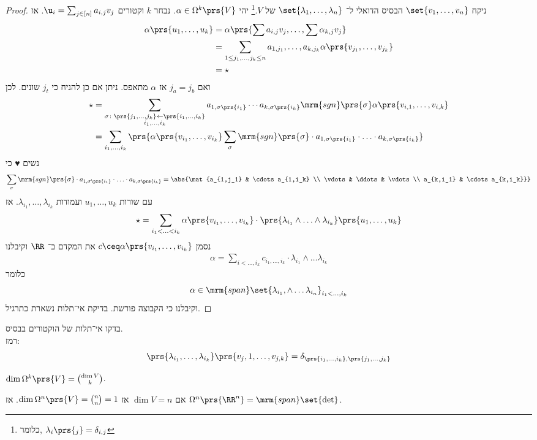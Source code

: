 \documentclass[a4paper,10pt,twoside,openany]{book}
\begin{document}
\begin{proof}
ניקח
$\set{v_1, \ldots, v_n}$
הבסיס הדואלי ל־%
$\set{\lambda_1, \ldots, \lambda_n}$
של
$V$.\footnote{
כלומר,
$\lambda_i\prs{_j} = \delta_{i,j}$
}
יהי
$\alpha \in \Omega^k\prs{V}$.
נבחר
$k$
וקטורים
$\u_{i} = \sum_{j \in [n]} a_{i,j}v_j$.
אז
\begin{align*}
\alpha\prs{u_1, \ldots, u_k} &= \alpha\prs{\sum a_{i,j} v_j, \ldots, \sum \alpha_{k,j} v_j} \\&=
\sum_{1 \leq j_1, \ldots, j_k \leq n} a_{1,j_1}, \ldots, a_{k,j_k} \alpha\prs{v_{j_1}, \ldots, v_{j_k}} \\&= \star
\end{align*}
ואם
$j_a = j_b$
אז
$\alpha$
מתאפס.
ניתן אם כן להניח כי
$j_t$
שונים.
לכן
\begin{align*}
\star &= \sum_{\substack{\sigma \colon \prs{j_1, \ldots, j_k} \leftarrow \prs{i_1, \ldots, i_k} \\ i_1, \ldots, i_k}} a_{1,\sigma\prs{i_1}} \cdots a_{k,\sigma\prs{i_k}} \mrm{sgn}\prs{\sigma} \alpha\prs{v_{i,1}, \ldots, v_{i,k}} \\
&= \sum_{i_1, \ldots, i_k} \prs{\alpha\prs{v_{i_1}, \ldots, v_{i_k}} \sum_{\sigma} \mrm{sgn}\prs{\sigma} \cdot a_{1,\sigma\prs{i_1}} \cdot \ldots \cdot a_{k,\sigma\prs{i_k}}}
\end{align*}
נשים ♥ כי
\[\sum_{\sigma} \mrm{sgn}\prs{\sigma} \cdot a_{1,\sigma\prs{i_1}} \cdot \ldots \cdot a_{k,\sigma\prs{i_k}} = \abs{\mat{a_{1,j_1} & \cdots a_{1,i_k} \\ \vdots & \ddots & \vdots \\ a_{k,i_1} & \cdots a_{k,i_k}}}\]
עם שורות
$u_1, \ldots, u_k$
ועמודות
$\lambda_{i_1}, \ldots, \lambda_{i_k}$.
אז
\[\star = \sum_{i_1< \ldots <i_k} \alpha\prs{v_{i_1}, \ldots, v_{i_k}} \cdot \prs{\lambda_{i_1} \wedge \ldots \wedge \lambda_{i_k}}\prs{u_1, \ldots, u_k}\]
נסמן
$c \ceq \alpha\prs{v_{i_1}, \ldots, v_{i_k}}$
את המקדם ב־%
$\RR$
וקיבלנו
\begin{align*}
\alpha = \sum_{i < \ldots, i_k} c_{i_1, \ldots, i_k} \cdot \lambda_{i_1} \wedge \ldots \lambda_{i_k}
\end{align*}
כלומר
\[\alpha \in \mrm{span}\set{\lambda_{i_1}, \wedge \ldots \lambda_{i_n}}_{i_1 < \ldots, i_k}\]
וקיבלנו כי הקבוצה פורשת.
בדיקת אי־תלות נשארת כתרגיל.
\end{proof}
\begin{exercise}
בדקו אי־תלות של הוקטורים בבסיס.
\\
רמז:
\[\prs{\lambda_{i_1}, \ldots, \lambda_{i_k}} \prs{v_j,1, \ldots, v_{j,k}} = \delta_{\prs{i_1, \ldots, i_k},\prs{j_1, \ldots, j_k}}\]
\end{exercise}
\begin{corollary}
$\dim \Omega^k \prs{V} = \binom{\dim V}{k}$.
\end{corollary}
\begin{corollary}
אם
$\dim V = n$
אז
$\dim \Omega^n \prs{V} = \binom{n}{n} = 1$.
אז
$\Omega^n\prs{\RR^n} = \mrm{span}\set{\det}$.
\end{corollary}
\end{document}
